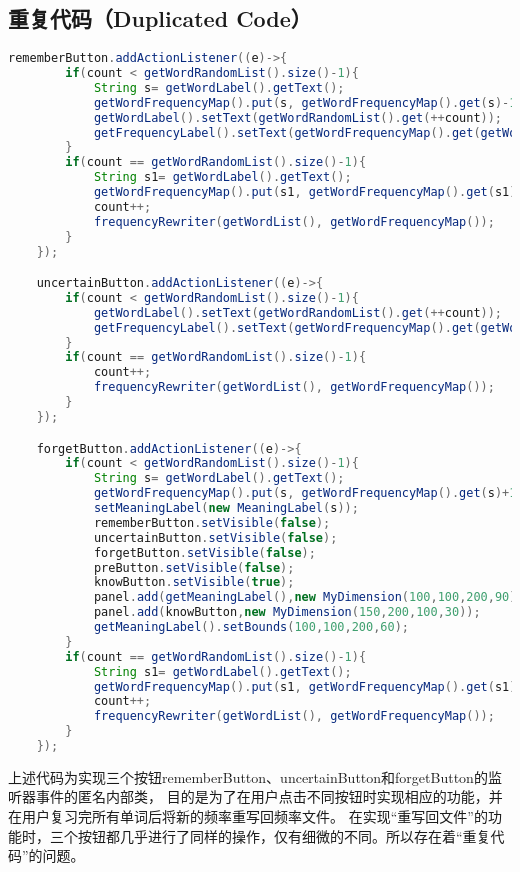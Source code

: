 \documentclass[a4paper]{article}
\begin{document}
\subsection{重复代码（Duplicated Code）}
\begin{lstlisting}[language={java}]
    rememberButton.addActionListener((e)->{
        if(count < getWordRandomList().size()-1){
            String s= getWordLabel().getText();
            getWordFrequencyMap().put(s, getWordFrequencyMap().get(s)-1);
            getWordLabel().setText(getWordRandomList().get(++count));
            getFrequencyLabel().setText(getWordFrequencyMap().get(getWordLabel().getText()).toString());
        }
        if(count == getWordRandomList().size()-1){
            String s1= getWordLabel().getText();
            getWordFrequencyMap().put(s1, getWordFrequencyMap().get(s1)-1);
            count++;
            frequencyRewriter(getWordList(), getWordFrequencyMap());
        }
    });

    uncertainButton.addActionListener((e)->{
        if(count < getWordRandomList().size()-1){
            getWordLabel().setText(getWordRandomList().get(++count));
            getFrequencyLabel().setText(getWordFrequencyMap().get(getWordLabel().getText()).toString());
        }
        if(count == getWordRandomList().size()-1){
            count++;
            frequencyRewriter(getWordList(), getWordFrequencyMap());
        }
    });

    forgetButton.addActionListener((e)->{
        if(count < getWordRandomList().size()-1){
            String s= getWordLabel().getText();
            getWordFrequencyMap().put(s, getWordFrequencyMap().get(s)+1);
            setMeaningLabel(new MeaningLabel(s));
            rememberButton.setVisible(false);
            uncertainButton.setVisible(false);
            forgetButton.setVisible(false);
            preButton.setVisible(false);
            knowButton.setVisible(true);
            panel.add(getMeaningLabel(),new MyDimension(100,100,200,90));
            panel.add(knowButton,new MyDimension(150,200,100,30));
            getMeaningLabel().setBounds(100,100,200,60);
        }
        if(count == getWordRandomList().size()-1){
            String s1= getWordLabel().getText();
            getWordFrequencyMap().put(s1, getWordFrequencyMap().get(s1)+1);
            count++;
            frequencyRewriter(getWordList(), getWordFrequencyMap());
        }
    });
\end{lstlisting}

上述代码为实现三个按钮rememberButton、uncertainButton和forgetButton的监听器事件的匿名内部类，
目的是为了在用户点击不同按钮时实现相应的功能，并在用户复习完所有单词后将新的频率重写回频率文件。
在实现“重写回文件”的功能时，三个按钮都几乎进行了同样的操作，仅有细微的不同。所以存在着“重复代码”的问题。
\end{document}
